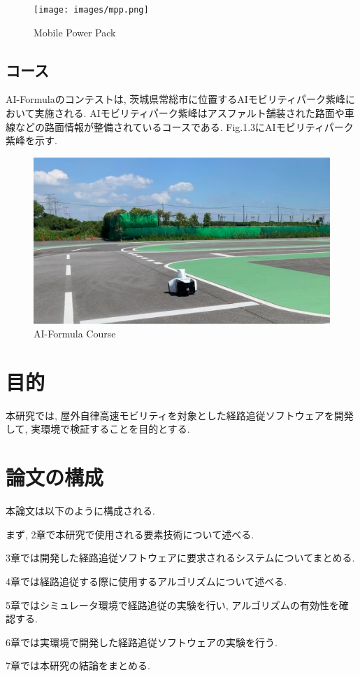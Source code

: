 \begin{figure}[H]
  \centering
 \texttt{[image: images/mpp.png]}
 \caption{Mobile Power Pack}
 \label{fig:MPP}
\end{figure}

\subsection{コース}
AI-Formulaのコンテストは, 茨城県常総市に位置するAIモビリティパーク紫峰において実施される.
AIモビリティパーク紫峰はアスファルト舗装された路面や車線などの路面情報が整備されているコースである.
Fig.1.3にAIモビリティパーク紫峰を示す.

\begin{figure}[H]
  \centering
 \includegraphics[keepaspectratio, scale=0.1]
      {images/realworld.png}
 \caption{AI-Formula Course}
 \label{fig:course}
\end{figure}


\section{目的}
本研究では, 屋外自律高速モビリティを対象とした経路追従ソフトウェアを開発して, 実環境で検証することを目的とする.


\section{論文の構成}
本論文は以下のように構成される.

まず, 2章で本研究で使用される要素技術について述べる.

3章では開発した経路追従ソフトウェアに要求されるシステムについてまとめる.

4章では経路追従する際に使用するアルゴリズムについて述べる.

5章ではシミュレータ環境で経路追従の実験を行い, アルゴリズムの有効性を確認する.

6章では実環境で開発した経路追従ソフトウェアの実験を行う.

7章では本研究の結論をまとめる.

\newpage
